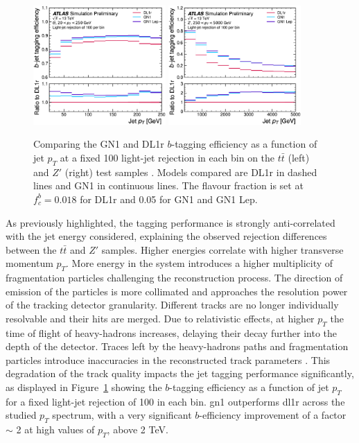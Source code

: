 \begin{figure}[h!]
  \centering
  \includegraphics[width=0.45\textwidth]{Images/FTAG/GN/GN1/eff/ptttb.png}
  \includegraphics[width=0.45\textwidth]{Images/FTAG/GN/GN1/eff/ptzpb.png}
  \caption{Comparing the GN1 and DL1r $b$-tagging efficiency as a function of jet $p_T$ at a fixed 100 light-jet rejection in each bin on the $t\bar{t}$ (left) and $Z'$ (right) test samples \cite{ATL-PHYS-PUB-2022-027}. Models compared are DL1r in dashed lines and GN1 in continuous lines. The flavour fraction is set at $f^b_c = 0.018$ for DL1r and 0.05 for GN1 and GN1 Lep.}
  \label{fig:GN1ptb}
\end{figure} 

\vspace{-0.2cm}
As previously highlighted, the tagging performance is strongly anti-correlated with the jet energy considered, explaining the observed rejection differences between the $t\bar{t}$ and $Z'$ samples. Higher energies correlate with higher transverse momentum $p_T$. More energy in the system introduces a higher multiplicity of fragmentation particles challenging the reconstruction process. The direction of emission of the particles is more collimated and approaches the resolution power of the tracking detector granularity. Different tracks are no longer individually resolvable and their hits are merged. Due to relativistic effects, at higher $p_T$ the time of flight of heavy-hadrons increases, delaying their decay further into the depth of the detector. Traces left by the heavy-hadrons paths and fragmentation particles introduce inaccuracies in the reconstructed track parameters \cite{ATLAS-tracks-algo}. This degradation of the track quality impacts the jet tagging performance significantly, as displayed in Figure~\ref{fig:GN1ptb} showing the $b$-tagging efficiency as a function of jet $p_T$ for a fixed light-jet rejection of 100 in each bin. \gls{gn1} outperforms \gls{dl1r} across the studied $p_T$ spectrum, with a very significant $b$-efficiency improvement of a factor $\sim$ 2 at high values of $p_T$, above 2 TeV. \\

